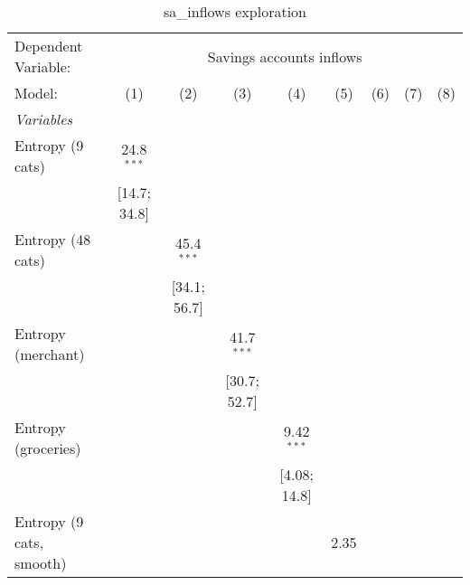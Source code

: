 
\begin{table}[htbp]
   \centering
   \tiny
   \begin{threeparttable}[b]
      \caption{\label{tab:reg_sa_inflows} sa\_inflows exploration}
      \begin{tabular}{lcccccccc}
         \tabularnewline \midrule \midrule
         Dependent Variable: & \multicolumn{8}{c}{Savings accounts inflows}\\
         Model:                      & (1)             & (2)             & (3)             & (4)             & (5)             & (6)             & (7)             & (8)\\  
         \midrule
         \emph{Variables}\\
         Entropy (9 cats)            & 24.8$^{***}$    &                 &                 &                 &                 &                 &                 &   \\   
                                     & [14.7; 34.8]    &                 &                 &                 &                 &                 &                 &   \\   
         Entropy (48 cats)           &                 & 45.4$^{***}$    &                 &                 &                 &                 &                 &   \\   
                                     &                 & [34.1; 56.7]    &                 &                 &                 &                 &                 &   \\   
         Entropy (merchant)          &                 &                 & 41.7$^{***}$    &                 &                 &                 &                 &   \\   
                                     &                 &                 & [30.7; 52.7]    &                 &                 &                 &                 &   \\   
         Entropy (groceries)         &                 &                 &                 & 9.42$^{***}$    &                 &                 &                 &   \\   
                                     &                 &                 &                 & [4.08; 14.8]    &                 &                 &                 &   \\   
         Entropy (9 cats, smooth)    &                 &                 &                 &                 & 2.35            &                 &                 &   \\   

\end{tabular}
\end{threeparttable}
\end{table}
